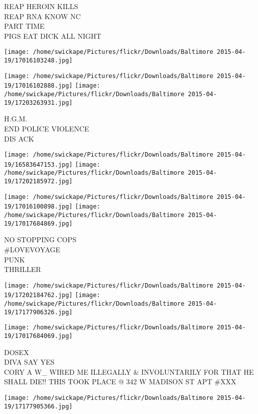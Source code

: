 \documentclass[10pt,letterpaper]{article}
\begin{document}
REAP HEROIN KILLS\\
REAP RNA KNOW NC\\
PART TIME\\
PIGS EAT DICK ALL NIGHT\\
\pagebreak

\texttt{[image: /home/swickape/Pictures/flickr/Downloads/Baltimore 2015-04-19/17016103248.jpg]}

\vspace{0.25in}
\texttt{[image: /home/swickape/Pictures/flickr/Downloads/Baltimore 2015-04-19/17016102888.jpg]}
\texttt{[image: /home/swickape/Pictures/flickr/Downloads/Baltimore 2015-04-19/17203263931.jpg]}

H.G.M.\\
END POLICE VIOLENCE\\
DIS ACK\\
\pagebreak

\texttt{[image: /home/swickape/Pictures/flickr/Downloads/Baltimore 2015-04-19/16583647153.jpg]}
\texttt{[image: /home/swickape/Pictures/flickr/Downloads/Baltimore 2015-04-19/17202185972.jpg]}

\texttt{[image: /home/swickape/Pictures/flickr/Downloads/Baltimore 2015-04-19/17016100898.jpg]}
\texttt{[image: /home/swickape/Pictures/flickr/Downloads/Baltimore 2015-04-19/17017684869.jpg]}

NO STOPPING COPS\\
\#LOVEVOYAGE\\
PUNK\\
THRILLER\\
\pagebreak

\texttt{[image: /home/swickape/Pictures/flickr/Downloads/Baltimore 2015-04-19/17202184762.jpg]}
\texttt{[image: /home/swickape/Pictures/flickr/Downloads/Baltimore 2015-04-19/17177906326.jpg]}

\vspace{0.25in}
\texttt{[image: /home/swickape/Pictures/flickr/Downloads/Baltimore 2015-04-19/17017684069.jpg]}

DOSEX\\
DIVA SAY YES\\
CORY A W\_ WIRED ME ILLEGALLY \& INVOLUNTARILY FOR THAT HE SHALL DIE!! THIS TOOK PLACE @ 342 W MADISON ST APT \#XXX\\
\pagebreak

\texttt{[image: /home/swickape/Pictures/flickr/Downloads/Baltimore 2015-04-19/17177905366.jpg]}
\end{document}
